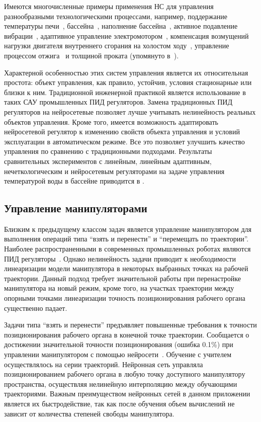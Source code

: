 Имеются многочисленные примеры применения НС для управления
разнообразными технологическими процессами, например, поддержание
температуры печи~\cite{sigom00}, бассейна~\cite{khomyu96}, наполнение
бассейна~\cite{kav96}, активное подавление вибрации~\cite{bouchard01},
адаптивное управление электромотором~\cite{linwaihong01}, компенсация
возмущений нагрузки двигателя внутреннего сгорания на холостом
ходу~\cite{gorfeld96}\cite{tukin01}, управление процессом
отжига~\cite{pican95} и толщиной проката (упомянуто
в~\cite{bondlog97}).

Характерной особенностью этих систем управления является их
относительная простота: объект управления, как правило, устойчив,
условия стационарные или близки к ним.  Традиционной инженерной
практикой является использование в таких САУ промышленных ПИД
регуляторов.  Замена традиционных ПИД регуляторов на нейросетевые
позволяет лучше учитывать нелинейность реальных объектов управления.
Кроме того, имеется возможность адаптировать нейросетевой регулятор к
изменению свойств объекта управления и условий эксплуатации в
автоматическом режиме.  Все это позволяет улучшить качество управления
по сравнению с традиционными подходами.  Результаты сравнительных
экспериментов с линейным, линейным адаптивным, нечеткологическим и
нейросетевым регуляторами на задаче управления температурой воды в
бассейне приводится в \cite{khomyu96}.

\subsection{Управление манипуляторами}

Близким к предыдущему классом задач является управление манипулятором
для выполнения операций типа ``взять и перенести'' и ``перемещать по
траектории''.  Наиболее распространенными в современных промышленных
роботах являются ПИД регуляторы~\cite{chenmills97}.  Однако
нелинейность задачи приводит к необходимости линеаризации модели
манипулятора в некоторых выбранных точках на рабочей траектории.
Данный подход требует значительной работы при перенастройке
манипулятора на новый режим, кроме того, на участках траектории между
опорными точками линеаризации точность позиционирования рабочего
органа существенно падает.

Задачи типа ``взять и перенести'' предъявляет повышенные требования к
точности позиционирования рабочего органа в конечной точке траектории.
Сообщается о достижении значительной точности позиционирования (ошибка
0.1\%) при управлении манипулятором с помощью
нейросети~\cite{bondlog97}.  Обучение с учителем осуществлялось на
серии траекторий.  Нейронная сеть управляла позиционированием рабочего
органа в любую точку доступного манипулятору пространства, осуществляя
нелинейную интерполяцию между обучающими траекториями.  Важным
преимуществом нейронных сетей в данном приложении является их
быстродействие, так как после обучения объем вычислений не зависит от
количества степеней свободы манипулятора.

